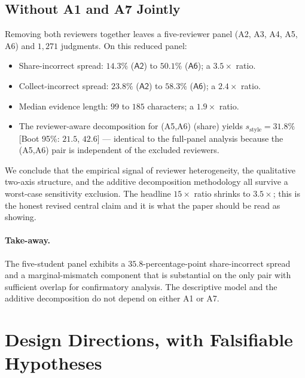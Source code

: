 \documentclass[11pt,a4paper]{article}
\newcommand{\Acc}[1]{\textsf{A#1}}
\begin{document}
\subsection{Without \Acc{1} and \Acc{7} Jointly}
\label{sec:sens-no-a1-a7}

Removing both reviewers together leaves a five-reviewer panel
(\Acc{2}, \Acc{3}, \Acc{4}, \Acc{5}, \Acc{6}) and $1{,}271$
judgments. On this reduced panel:
%
\begin{itemize}[leftmargin=*,topsep=2pt,nosep]
\item Share-incorrect spread: $14.3\%$ ($\Acc{2}$) to $50.1\%$
       ($\Acc{6}$); a $3.5{\times}$ ratio.
\item Collect-incorrect spread: $23.8\%$ ($\Acc{2}$) to $58.3\%$
       ($\Acc{6}$); a $2.4{\times}$ ratio.
\item Median evidence length: $99$ to $185$ characters; a
       $1.9{\times}$ ratio.
\item The reviewer-aware decomposition for (\Acc{5},\Acc{6})
       (share) yields $s_{\text{style}}=31.8\%$
       [Boot 95\%: $21.5$, $42.6$] --- identical to the full-panel
       analysis because the (\Acc{5},\Acc{6}) pair is independent
       of the excluded reviewers.
\end{itemize}
%
We conclude that the empirical signal of reviewer heterogeneity, the
qualitative two-axis structure, and the additive decomposition
methodology all survive a worst-case sensitivity exclusion. The
headline $15{\times}$ ratio shrinks to $3.5{\times}$; this is the
honest revised central claim and it is what the paper should be
read as showing.

\paragraph{Take-away.}
The five-student panel exhibits a $35.8$-percentage-point
share-incorrect spread and a marginal-mismatch component that is
substantial on the only pair with sufficient overlap for
confirmatory analysis. The descriptive model and the additive
decomposition do not depend on either \Acc{1} or \Acc{7}.

\section{Design Directions, with Falsifiable Hypotheses}
\label{sec:design}
\end{document}
